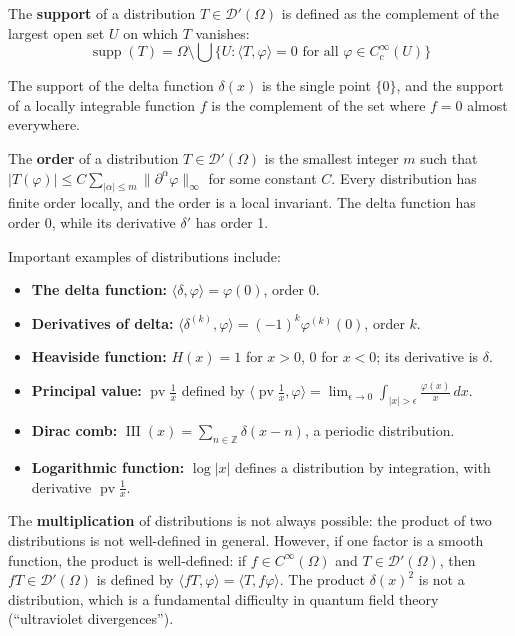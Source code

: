 \begin{definition}[Support]
The \textbf{support} of a distribution $T \in \mathcal{D}'(\Omega)$ is defined as the complement of the largest open set $U$ on which $T$ vanishes:
\[\operatorname{supp}(T) = \Omega \setminus \bigcup \{U : \langle T, \varphi \rangle = 0 \text{ for all } \varphi \in C_c^\infty(U)\}\]
\end{definition}

The support of the delta function $\delta(x)$ is the single point $\{0\}$, and the support of a locally integrable function $f$ is the complement of the set where $f = 0$ almost everywhere.

\begin{definition}[Order]
The \textbf{order} of a distribution $T \in \mathcal{D}'(\Omega)$ is the smallest integer $m$ such that $|T(\varphi)| \leq C \sum_{|\alpha| \leq m} \|\partial^\alpha \varphi\|_\infty$ for some constant $C$. Every distribution has finite order locally, and the order is a local invariant. The delta function has order 0, while its derivative $\delta'$ has order 1.
\end{definition}

\begin{example}
Important examples of distributions include:
\begin{itemize}
\item \textbf{The delta function:} $\langle \delta, \varphi \rangle = \varphi(0)$, order 0.
\item \textbf{Derivatives of delta:} $\langle \delta^{(k)}, \varphi \rangle = (-1)^k \varphi^{(k)}(0)$, order $k$.
\item \textbf{Heaviside function:} $H(x) = 1$ for $x > 0$, $0$ for $x < 0$; its derivative is $\delta$.
\item \textbf{Principal value:} $\operatorname{pv}\frac{1}{x}$ defined by $\langle \operatorname{pv}\frac{1}{x}, \varphi \rangle = \lim_{\epsilon \to 0} \int_{|x|>\epsilon} \frac{\varphi(x)}{x} \, dx$.
\item \textbf{Dirac comb:} $\operatorname{III}(x) = \sum_{n \in \mathbb{Z}} \delta(x - n)$, a periodic distribution.
\item \textbf{Logarithmic function:} $\log|x|$ defines a distribution by integration, with derivative $\operatorname{pv}\frac{1}{x}$.
\end{itemize}
\end{example}

The \textbf{multiplication} of distributions is not always possible: the product of two distributions is not well-defined in general. However, if one factor is a smooth function, the product is well-defined: if $f \in C^\infty(\Omega)$ and $T \in \mathcal{D}'(\Omega)$, then $fT \in \mathcal{D}'(\Omega)$ is defined by $\langle fT, \varphi \rangle = \langle T, f\varphi \rangle$. The product $\delta(x)^2$ is not a distribution, which is a fundamental difficulty in quantum field theory (``ultraviolet divergences'').

